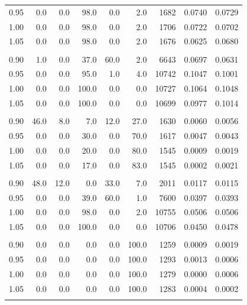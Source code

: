 \begin{table}[t]
\begin{tabular}{r r r r r r r r r}
0.95 & 0.0 & 0.0 & 98.0 & 0.0 & 2.0 & 1682 & 0.0740 & 0.0729 \\
1.00 & 0.0 & 0.0 & 98.0 & 0.0 & 2.0 & 1706 & 0.0722 & 0.0702 \\
1.05 & 0.0 & 0.0 & 98.0 & 0.0 & 2.0 & 1676 & 0.0625 & 0.0680 \\
\addlinespace[0.35em]
\multicolumn{9}{l}{$N=16$, $\mathrm{ppn}=4$, $t=10\,\mathrm{s}$} \\
\midrule
0.90 & 1.0 & 0.0 & 37.0 & 60.0 & 2.0 & 6643 & 0.0697 & 0.0631 \\
0.95 & 0.0 & 0.0 & 95.0 & 1.0 & 4.0 & 10742 & 0.1047 & 0.1001 \\
1.00 & 0.0 & 0.0 & 100.0 & 0.0 & 0.0 & 10727 & 0.1064 & 0.1048 \\
1.05 & 0.0 & 0.0 & 100.0 & 0.0 & 0.0 & 10699 & 0.0977 & 0.1014 \\
\addlinespace[0.35em]
\multicolumn{9}{l}{$N=16$, $\mathrm{ppn}=8$, $t=1\,\mathrm{s}$} \\
\midrule
0.90 & 46.0 & 8.0 & 7.0 & 12.0 & 27.0 & 1630 & 0.0060 & 0.0056 \\
0.95 & 0.0 & 0.0 & 30.0 & 0.0 & 70.0 & 1617 & 0.0047 & 0.0043 \\
1.00 & 0.0 & 0.0 & 20.0 & 0.0 & 80.0 & 1545 & 0.0009 & 0.0019 \\
1.05 & 0.0 & 0.0 & 17.0 & 0.0 & 83.0 & 1545 & 0.0002 & 0.0021 \\
\addlinespace[0.35em]
\multicolumn{9}{l}{$N=16$, $\mathrm{ppn}=8$, $t=10\,\mathrm{s}$} \\
\midrule
0.90 & 48.0 & 12.0 & 0.0 & 33.0 & 7.0 & 2011 & 0.0117 & 0.0115 \\
0.95 & 0.0 & 0.0 & 39.0 & 60.0 & 1.0 & 7600 & 0.0397 & 0.0393 \\
1.00 & 0.0 & 0.0 & 98.0 & 0.0 & 2.0 & 10755 & 0.0506 & 0.0506 \\
1.05 & 0.0 & 0.0 & 100.0 & 0.0 & 0.0 & 10706 & 0.0450 & 0.0478 \\
\addlinespace[0.35em]
\multicolumn{9}{l}{$N=32$, $\mathrm{ppn}=4$, $t=1\,\mathrm{s}$} \\
\midrule
0.90 & 0.0 & 0.0 & 0.0 & 0.0 & 100.0 & 1259 & 0.0009 & 0.0019 \\
0.95 & 0.0 & 0.0 & 0.0 & 0.0 & 100.0 & 1293 & 0.0013 & 0.0006 \\
1.00 & 0.0 & 0.0 & 0.0 & 0.0 & 100.0 & 1279 & 0.0000 & 0.0006 \\
1.05 & 0.0 & 0.0 & 0.0 & 0.0 & 100.0 & 1283 & 0.0004 & 0.0002 \\
\addlinespace[0.35em]
\multicolumn{9}{l}{$N=32$, $\mathrm{ppn}=4$, $t=10\,\mathrm{s}$} \\

\end{tabular}
\end{table}
